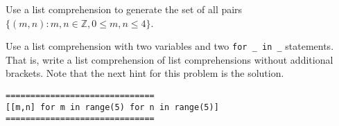 \documentclass{ximera}
\begin{document}
\begin{question}
	Use a list comprehension to generate the set of all pairs $\{(m,n):m,n\in\mathbb{Z}, 0\leq m,n\leq 4\}$. 
	\begin{hint}
	Use a list comprehension with two variables and two \verb|for _ in _| statements. That is, write a list comprehension of list comprehensions without additional brackets. Note that the next hint for this problem is the solution. 
	\end{hint}
	\begin{hint}
\begin{verbatim}
==============================
[[m,n] for m in range(5) for n in range(5)]
==============================
\end{verbatim}
	\end{hint}
\end{question}
\end{document}
